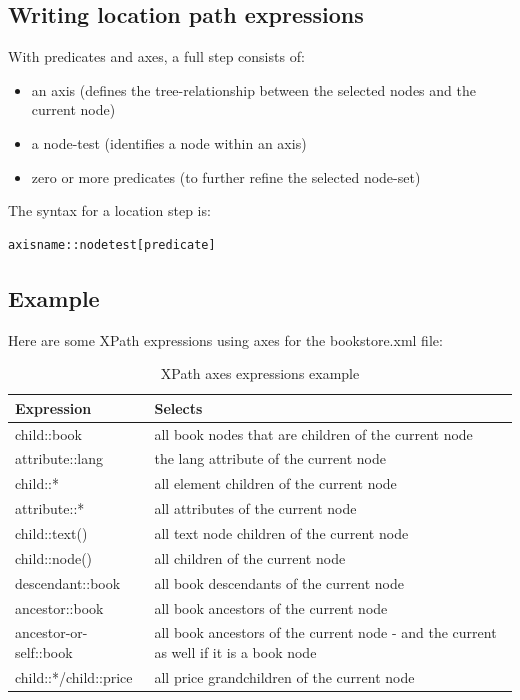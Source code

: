 \documentclass{pgnotes}
\begin{document}
\subsection{Writing location path expressions}

With predicates and axes, a full step consists of:

\begin{itemize}
\item an axis (defines the tree-relationship between the selected nodes and the current node)
\item a node-test (identifies a node within an axis)
\item zero or more predicates (to further refine the selected node-set)
\end{itemize}

The syntax for a location step is:
\begin{verbatim}
axisname::nodetest[predicate]
\end{verbatim}


\subsection{Example}

Here are some XPath expressions using axes for the bookstore.xml file:

\begin{table}[htbp]
  \begin{tabularx}{1.0\linewidth}{l X}
    \toprule
    \textbf{Expression} & \textbf{Selects} \\
    \midrule
    child::book & 	 all book nodes that are children of the current node \\
    attribute::lang &	 the lang attribute of the current node \\
    child::* &	 all element children of the current node \\
    attribute::* &	 all attributes of the current node \\
    child::text() &	 all text node children of the current node \\ 
    child::node() &	 all children of the current node \\ 
    descendant::book &	 all book descendants of the current node \\ 
    ancestor::book &	 all book ancestors of the current node \\ 
    ancestor-or-self::book &	 all book ancestors of the current node - and the current as well if it is a book node \\
    child::*/child::price &	 all price grandchildren of the current node\\
    \bottomrule
  \end{tabularx}
  \caption{XPath axes expressions example}
  \label{tab:xpath-axes-example}
\end{table}
\end{document}
